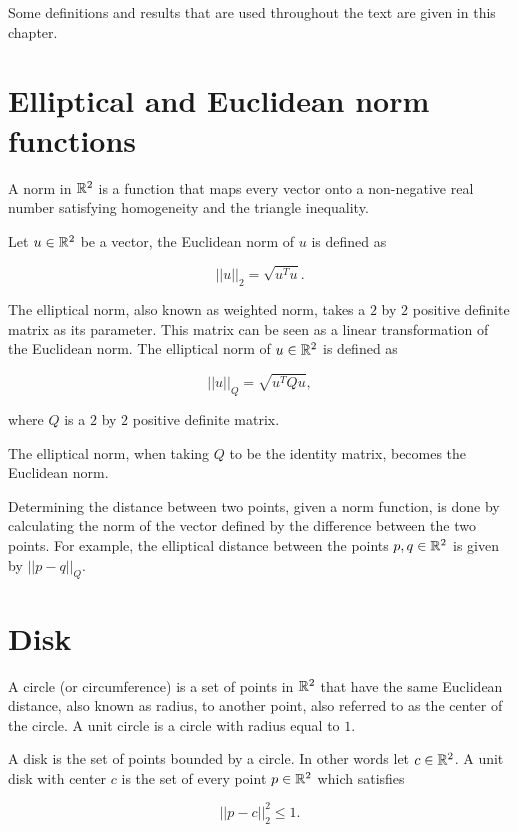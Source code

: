 Some definitions and results that are used throughout the text are given in this chapter.

\section{Elliptical and Euclidean norm functions}

A norm in $\mathbb{R}^2$ is a function that maps every vector onto a non-negative real number satisfying homogeneity and the triangle inequality. 

Let $u \in \mathbb{R}^2$ be a vector, the Euclidean norm of $u$ is defined as

\begin{equation}\label{eq:norm2}
||u||_2 = \sqrt{u^{T}u}.
\end{equation}

\noindent The elliptical norm, also known as weighted norm, takes a $2$ by $2$ positive definite matrix as its parameter. This matrix can be seen as a linear transformation of the Euclidean norm. The elliptical norm of $u \in\mathbb{R}^2$ is defined as 

\begin{equation}
||u||_{Q} = \sqrt{u^{T}Qu},
\end{equation}

\noindent where $Q$ is a $2$ by $2$ positive definite matrix.

The elliptical norm, when taking $Q$ to be the identity matrix, becomes the Euclidean norm.

Determining the distance between two points, given a norm function, is done by calculating the norm of the vector defined by the difference between the two points. For example, the elliptical distance between the points $p,q \in \mathbb{R}^2$ is given by $||p-q||_{Q}$.

\section{Disk}

A circle (or circumference) is a set of points in $\mathbb{R}^2$ that have the same Euclidean distance, also known as radius, to another point, also referred to as the center of the circle. A unit circle is a circle with radius equal to $1$.

A disk is the set of points bounded by a circle. In other words let $c \in \mathbb{R}^2$. A unit disk with center $c$ is the set of every point $p \in \mathbb{R}^2$ which satisfies

\begin{equation}\label{eq:disk}
||p-c||_2^2 \le 1.
\end{equation} 

